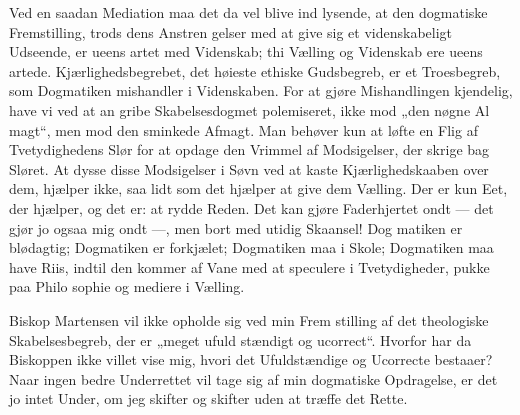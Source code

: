 \documentclass[12pt]{book}
\begin{document}
Ved en saadan Mediation maa det da vel blive ind\-%
lysende, at den dogmatiske Fremstilling, trods dens Anstren\-%
gelser med at give sig et videnskabeligt Udseende, er ueens\-%
artet med Videnskab; thi Vælling og Videnskab ere ueens\-%
artede. Kjærlighedsbegrebet, det høieste ethiske Gudsbegreb, er
et Troesbegreb, som Dogmatiken mishandler i Videnskaben.
For at gjøre Mishandlingen kjendelig, have vi ved at an\-%
gribe Skabelsesdogmet polemiseret, ikke mod „den nøgne Al\-%
magt“, men mod den sminkede Afmagt. Man behøver kun
at løfte en Flig af Tvetydighedens Slør for at opdage den
Vrimmel af Modsigelser, der skrige bag Sløret. At dysse
disse Modsigelser i Søvn ved at kaste Kjærlighedskaaben over
dem, hjælper ikke, saa lidt som det hjælper at give dem
Vælling. Der er kun Eet, der hjælper, og det er: at rydde
Reden. Det kan gjøre Faderhjertet ondt --- det gjør jo
ogsaa mig ondt ---, men bort med utidig Skaansel! Dog\-%
matiken er blødagtig; Dogmatiken er forkjælet; Dogmatiken
maa i Skole; Dogmatiken maa have Riis, indtil den kommer
af Vane med at speculere i Tvetydigheder, pukke paa Philo\-%
sophie og mediere i Vælling.

Biskop Martensen vil ikke opholde sig ved min Frem\-%
stilling af det theologiske Skabelsesbegreb, der er „meget ufuld\-%
stændigt og ucorrect“. Hvorfor har da Biskoppen ikke villet
vise mig, hvori det Ufuldstændige og Ucorrecte bestaaer?
Naar ingen bedre Underrettet vil tage sig af min dogmatiske
Opdragelse, er det jo intet Under, om jeg skifter og skifter
uden at træffe det Rette.
\end{document}
